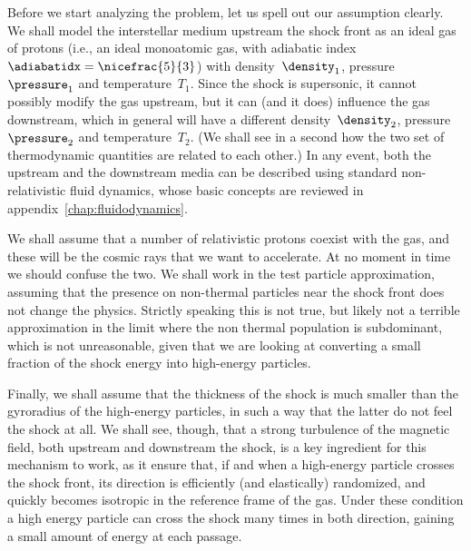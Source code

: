 Before we start analyzing the problem, let us spell out our assumption clearly.
We shall model the interstellar medium upstream the shock front as an ideal gas of protons
(i.e., an ideal monoatomic gas, with adiabatic index $\adiabatidx = \nicefrac{5}{3}$)
with density~$\density_1$, pressure~$\pressure_1$ and temperature~$T_1$. Since
the shock is supersonic, it cannot possibly modify the gas upstream, but it can
(and it does) influence the gas downstream, which in general will have a different
density~$\density_2$, pressure~$\pressure_2$ and temperature~$T_2$. (We shall see
in a second how the two set of thermodynamic quantities are related to each other.)
In any event, both the upstream and the downstream media can be described using
standard non-relativistic fluid dynamics, whose basic concepts are reviewed in
appendix~\ref{chap:fluidodynamics}.

We shall assume that a number of relativistic
protons coexist with the gas, and these will be the cosmic rays that we
want to accelerate. At no moment in time we should confuse the two. We shall work
in the test particle approximation, assuming that the presence on non-thermal
particles near the shock front does not change the physics. Strictly speaking this
is not true, but likely not a terrible approximation in the limit where the non
thermal population is subdominant, which is not unreasonable, given that we are
looking at converting a small fraction of the shock energy into high-energy particles.

Finally, we shall assume that the thickness of the shock is much smaller than the
gyroradius of the high-energy particles, in such a way that the latter do not
feel the shock at all. We shall see, though, that a strong turbulence of the magnetic
field, both upstream and downstream the shock, is a key ingredient for this mechanism
to work, as it ensure that, if and when a high-energy particle crosses the shock
front, its direction is efficiently (and elastically) randomized, and quickly becomes
isotropic in the reference frame of the gas. Under these condition a high energy
particle can cross the shock many times in both direction, gaining a small amount
of energy at each passage.

\begin{marginfigure}
  
  \caption{Schematic view of a parallel shock in the reference frame where the
  shock front is at rest.}
  \label{fig:shock_cartoon_front}
\end{marginfigure}

